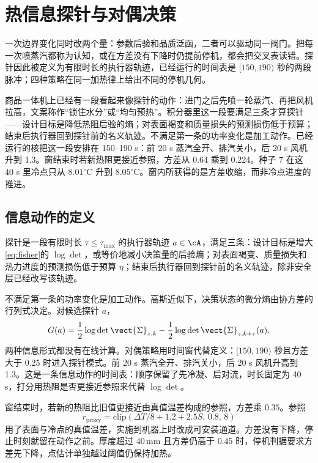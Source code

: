 \chapter{热信息探针与对偶决策}
\label{ch:ati}

一次边界变化同时改两个量：参数后验和品质泛函，二者可以驱动同一阀门。把每一次喷蒸汽都称为认知，或在方差没有下降时仍提前停机，都会把交叉表读错。探针因此被定义为有限时长的执行器轨迹，已经运行的时间表是 \([150,190)\) 秒的两段脉冲；四种策略在同一加热律上给出不同的停机几何。

商品一体机上已经有一段看起来像探针的动作：进门之后先喷一轮蒸汽、再把风机拉高，文案称作“锁住水分”或“均匀预热”。积分器里这一段要满足三条才算探针——设计目标是降低热阻后验的熵；对表面褐变和质量损失的预测损伤低于预算；结束后执行器回到探针前的名义轨迹。不满足第一条的功率变化是加工动作。已经运行的核把这一段安排在 150--190 s：前 20 s 蒸汽全开、排汽关小，后 20 s 风机升到 1.3。窗结束时若新热阻更接近参照，方差从 0.64 乘到 0.224。种子 7 在这 40 s 里冷点只从 \(8.01^\circ\mathrm{C}\) 升到 \(8.05^\circ\mathrm{C}\)。窗内所获得的是方差收缩，而非冷点进度的推进。

\section{信息动作的定义}

\begin{definition}[热信息探针]
探针是一段有限时长 \(\tau\le\tau_{\max}\) 的执行器轨迹 \(a\in\cA\)，满足三条：设计目标是增大\eqref{eq:fisher}的 \(\log\det\)，或等价地减小决策量的后验熵；对表面褐变、质量损失和热力进度的预测损伤低于预算 \(\eta\)；结束后执行器回到探针前的名义轨迹，除非安全层已经改写该轨迹。
\end{definition}

不满足第一条的功率变化是加工动作。高斯近似下，决策状态的微分熵由协方差的行列式决定。对候选探针 \(a\)，
\begin{equation}
\label{eq:ati}
G(a)=\frac12\log\det\vect{\Sigma}_{z,k}
-\frac12\log\det\vect{\Sigma}_{z,k+\tau}(a).
\end{equation}
两种信息形式都没有在线计算。对偶策略用时间窗代替定义：\([150,190)\) 秒且方差大于 0.25 时进入探针模式。前 20 s 蒸汽全开、排汽关小，后 20 s 风机升高到 1.3。这是一条信息动作的时间表：顺序保留了先冷凝、后对流，时长固定为 40 s，打分用热阻是否更接近参照来代替 \(\log\det\)。

窗结束时，若新的热阻比旧值更接近由真值温差构成的参照，方差乘 \(0.35\)。参照
\[
r_{\mathrm{proxy}}=\mathrm{clip}(\Delta T/8+1.2+2.5 S,\,0.8,\,8)
\]
用了表面与冷点的真值温差，实施到机器上时改成可安装通道。方差没有下降，停止时刻就留在动作之前。厚度超过 \(40\,\mathrm{mm}\) 且方差仍高于 \(0.45\) 时，停机判据要求方差先下降，点估计单独越过阈值仍保持加热。

